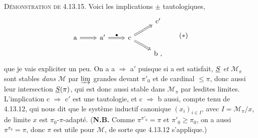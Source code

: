 \textsc{Démonstration de} 4.13.15. Voici les implications $\pm$ tautologiques,
\[
\begin{tikzcd}[row sep=small]
 & & & \mathrm{c}' \\
\mathrm{a} \arrow[r, Rightarrow] & \mathrm{a}' \arrow[r, Rightarrow, "\bullet"] & \mathrm{c} \arrow[ur, Rightarrow] \arrow[dr, Rightarrow] & \\
 & & & \mathrm{b}\ ,
\end{tikzcd}
\tag*{$(*)$}
\]
que je vais expliciter un peu. On a a $\Longrightarrow$ a$'$ puisque si a est satisfait, $\underline{S}$ \textit{et} $\mathcal{M}_\pi$ sont stables \textit{dans} $\mathcal{M}$ par $\varinjlim$ grandes devant $\pi'_0$ et de cardinal $\leqslant \pi$, donc aussi leur intersection $\underline{S}(\pi)$,
qui est donc aussi stable dans $\mathcal{M}_\pi$ par lesdites limites. L'implication c $\Longrightarrow$ c$'$ est une tautologie, et c $\Longrightarrow$ b aussi, compte tenu de 4.13.12, qui nous dit que le système inductif canonique $(x_i)_{i\in I}$, avec $I = \mathcal{M}_\pi/x$, de limite $x$ est $\pi_0$-$\pi$-adapté. (\textbf{N.B.} Comme $\pi^{\pi'_0} = \pi$ et $\pi'_0 \geqslant \pi_0$, on a aussi $\pi^{\pi_0} = \pi$, donc $\pi$ est utile pour $\mathcal{M}$, de sorte que 4.13.12 s'applique.)

